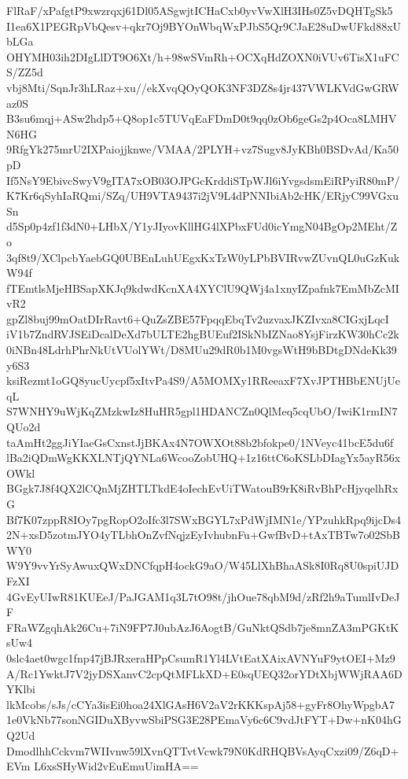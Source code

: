 FlRaF/xPafgtP9xwzrqxj61Dl05ASgwjtICHaCxb0yvVwXlH3IHs0Z5vDQHTgSk5
I1ea6X1PEGRpVbQesv+qkr7Oj9BYOnWbqWxPJbS5Qr9CJaE28uDwUFkd88xUbLGa
OHYMH03ih2DIgLlDT9O6Xt/h+98wSVmRh+OCXqHdZOXN0iVUv6TisX1uFCS/ZZ5d
vbj8Mti/SqnJr3hLRaz+xu//ekXvqQOyQOK3NF3DZ8s4jr437VWLKVdGwGRWaz0S
B3su6mqj+ASw2hdp5+Q8op1c5TUVqEaFDmD0t9qq0zOb6geGs2p4Oca8LMHVN6HG
9RfgYk275mrU2IXPaiojjknwe/VMAA/2PLYH+vz7Sugv8JyKBh0BSDvAd/Ka50pD
If5NsY9EbivcSwyV9gITA7xOB03OJPGcKrddiSTpWJl6iYvgsdsmEiRPyiR80mP/
K7Kr6qSyhIaRQmi/SZq/UH9VTA9437i2jV9L4dPNNIbiAb2cHK/ERjyC99VGxuSn
d5Sp0p4zf1f3dN0+LHbX/Y1yJIyovKllHG4lXPbxFUd0icYmgN04BgOp2MEht/Zo
3qf8t9/XClpcbYaebGQ0UBEnLuhUEgxKxTzW0yLPbBVIRvwZUvnQL0uGzKukW94f
fTEmtlsMjeHBSapXKJq9kdwdKcnXA4XYClU9QWj4a1xnyIZpafnk7EmMbZcMIvR2
gpZl8buj99mOatDIrRavt6+QuZsZBE57FpqqEbqTv2uzvaxJKZIvxa8CIGxjLqcI
iV1b7ZndRVJSEiDcalDeXd7bULTE2hgBUEuf2ISkNbIZNao8YsjFirzKW30hCc2k
0iNBn48LdrhPhrNkUtVUolYWt/D8MUu29dR0b1M0vgsWtH9bBDtgDNdeKk39y6S3
ksiRezmt1oGQ8yucUycpf5xItvPa4S9/A5MOMXy1RReeaxF7XvJPTHBbENUjUeqL
S7WNHY9uWjKqZMzkwIz8HuHR5gpl1HDANCZn0QlMeq5cqUbO/IwiK1rmIN7QUo2d
taAmHt2ggJiYIaeGsCxnstJjBKAx4N7OWXOt88b2bfokpe0/1NVeyc41bcE5du6f
lBa2iQDmWgKKXLNTjQYNLa6WcooZobUHQ+1z16ttC6oKSLbDIagYx5ayR56xOWkl
BGgk7J8f4QX2lCQnMjZHTLTkdE4oIechEvUiTWatouB9rK8iRvBhPcHjyqelhRxG
Bf7K07zppR8IOy7pgRopO2oIfc3l7SWxBGYL7xPdWjIMN1e/YPzuhkRpq9ijcDs4
2N+xsD5zotmJYO4yTLbhOnZvfNqjzEyIvhubnFu+GwfBvD+tAxTBTw7o02SbBWY0
W9Y9vvYrSyAwuxQWxDNCfqpH4ockG9aO/W45LlXhBhaASk8I0Rq8U0spiUJDFzXI
4GvEyUIwR81KUEeJ/PaJGAM1q3L7tO98t/jhOue78qbM9d/zRf2h9aTumlIvDeJF
FRaWZgqhAk26Cu+7iN9FP7J0ubAzJ6AogtB/GuNktQSdb7je8mnZA3mPGKtKsUw4
0slc4aet0wgc1fnp47jBJRxeraHPpCsumR1Yl4LVtEatXAixAVNYuF9ytOEI+Mz9
A/Rc1YwktJ7V2jyDSXanvC2cpQtMFLkXD+E0sqUEQ32orYDtXbjWWjRAA6DYKlbi
lkMcobs/sJs/cCYa3isEi0hoa24XlGAsH6V2aV2rKKKspAj58+gyFr8OhyWpgbA7
1e0VkNb77sonNGIDuXByvwSbiPSG3E28PEmaVy6c6C9vdJtFYT+Dw+nK04hGQ2Ud
DmodlhhCckvm7WIIvnw59lXvnQTTvtVcwk79N0KdRHQBVsAyqCxzi09/Z6qD+EVm
L6xsSHyWid2vEuEmuUimHA==
